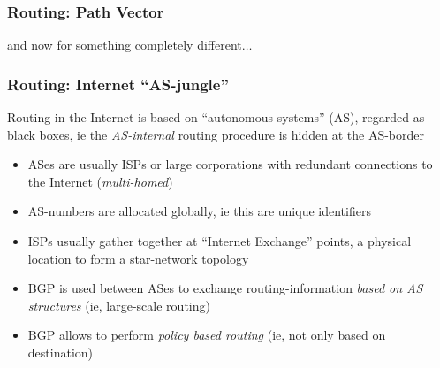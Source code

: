 \documentclass[ignorenonframetext]{beamer}
\begin{document}
\begin{frame}
\frametitle{Routing: Path Vector}
\vfill
\centerline{and now for something completely different$\ldots$}
\end{frame}


\begin{frame}
\label{BGP}
\frametitle{Routing: Internet ``AS-jungle''}
\begin{small}
Routing in the Internet is based on ``autonomous systems'' (AS), regarded as black boxes, 
ie the \emph{AS-internal} routing procedure is hidden at the AS-border
\hspace{-0.5cm}
\begin{minipage}[t]{3.5cm}
	\begin{tiny}
	\begin{itemize}
		\item ASes are usually ISPs or large corporations with redundant connections to the Internet (\emph{multi-homed})
		\item AS-numbers are allocated globally\footnotemark[21], ie this are unique identifiers
		\item ISPs usually gather together at ``Internet Exchange'' points\footnotemark[22], a physical
			location to form a star-network topology
		\item BGP is used between ASes to exchange routing-information \emph{based on AS structures}
			(ie, large-scale routing)
		\item BGP allows to perform \emph{policy based routing} (ie, not only based on destination)
	\end{itemize}
	\end{tiny}
\end{minipage}
\end{small}
\begin{minipage}[t]{8cm}
	\hspace{-1cm}\vspace{-0.5cm}
	\begin{center}

\end{center}
\end{minipage}
\end{frame}
\end{document}
